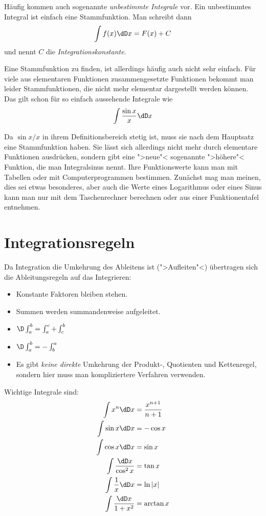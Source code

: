 Häufig kommen auch sogenannte \emph{unbestimmte Integrale} vor. Ein
unbestimmtes Integral ist einfach eine Stammfunktion. Man schreibt dann
\[
\int f(x)\dD x= F(x)+C
\]
und nennt $C$ die \emph{Integrationskonstante}.

Eine Stammfunktion zu finden, ist allerdings häufig auch nicht sehr einfach.
Für viele aus elementaren Funktionen zusammengesetzte Funktionen bekommt man
leider Stammfunktionen, die nicht mehr elementar dargestellt werden können. Das gilt
schon für so einfach aussehende Integrale wie
\[
\int \frac{\sin x}{x}\dD x
\]

Da $\sin x /x$ in ihrem Definitionsbereich stetig ist, muss sie nach dem
Hauptsatz eine Stammfunktion haben. Sie lässt sich allerdings nicht mehr durch
elementare Funktionen ausdrücken, sondern gibt eine ">neue"< sogenannte
">höhere"< Funktion, die man Integralsinus nennt. Ihre Funktionswerte kann man
mit Tabellen oder mit Computerprogrammen bestimmen. Zunächst mag man meinen,
dies sei etwas besonderes, aber auch die Werte eines Logarithmus oder eines
Sinus kann man nur mit dem Taschenrechner berechnen oder aus einer
Funktionentafel entnehmen.

\section{Integrationsregeln}

Da Integration die Umkehrung des Ableitens ist (">Aufleiten"<) übertragen sich
die Ableitungsregeln auf das Integrieren:
\begin{itemize}
\item Konstante Faktoren bleiben stehen.
\item Summen werden summandenweise aufgeleitet.
\item $\D\int_a^b=\int_a^c+\int_c^b$
\item $\D \int_a^b=-\int_b^a$
\item Es gibt \emph{keine direkte} Umkehrung der Produkt-, Quotienten und
  Kettenregel, sondern hier muss man kompliziertere Verfahren verwenden.
\end{itemize}

Wichtige Integrale sind:
\begin{align}
  \label{eq:36}
  \int x^n\dD x&=\frac{x^{n+1}}{n+1}\\
  \int\sin x\dD x&= -\cos x\label{eq:37}\\
  \int\cos x\dD x&= \sin x\label{eq:38}\\
  \int\frac{\dD x}{\cos^2x}&= \tan x\label{eq:39}\\
  \int\frac{1}{x}\dD x&= \ln|x|\label{eq:40}\\
  \int\frac{\dD x}{1+x^2}&= \arctan x\label{eq:41}
\end{align}

